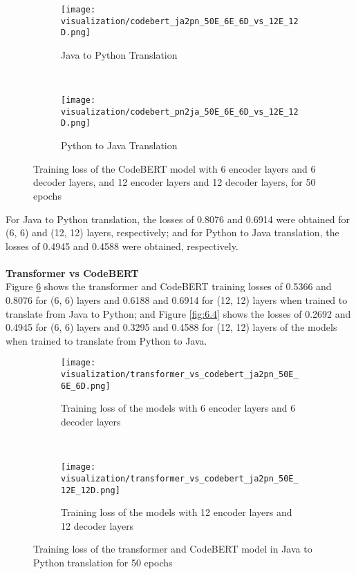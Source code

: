 \begin{figure}[H]
\centering
  \begin{subfigure}[h]{0.45\textwidth}
    \texttt{[image: visualization/codebert\_ja2pn\_50E\_6E\_6D\_vs\_12E\_12D.png]}
    \caption{Java to Python Translation}
    \label{fig:6.2_a}
  \end{subfigure}
  ~
  \begin{subfigure}[h]{0.45\textwidth}
    \texttt{[image: visualization/codebert\_pn2ja\_50E\_6E\_6D\_vs\_12E\_12D.png]}
    \caption{Python to Java Translation}
    \label{fig:6.2_b}
  \end{subfigure}
\caption[Training loss of the CodeBERT model with 6 encoder layers and 6 decoder layers, and 12 encoder layers and 12 decoder layers, for 50 epochs]{Training loss of the CodeBERT model with 6 encoder layers and 6 decoder layers, and 12 encoder layers and 12 decoder layers, for 50 epochs}
\label{fig:6.2}
\end{figure}
\noindent
For Java to Python translation, the losses of 0.8076 and 0.6914 were obtained for (6, 6) and (12, 12) layers, respectively; and for Python to Java translation, the losses of 0.4945 and 0.4588 were obtained, respectively.
\\\\
\textbf{Transformer vs CodeBERT} \\
Figure \ref{fig:6.3} shows the transformer and CodeBERT training losses of 0.5366 and 0.8076 for (6, 6) layers and 0.6188 and 0.6914 for (12, 12) layers when trained to translate from Java to Python; and Figure \ref{fig:6.4} shows the losses of 0.2692 and 0.4945 for (6, 6) layers and 0.3295 and 0.4588 for (12, 12) layers of the models when trained to translate from Python to Java.
\begin{figure}[H]
\centering
  \begin{subfigure}[h]{0.45\textwidth}
    \texttt{[image: visualization/transformer\_vs\_codebert\_ja2pn\_50E\_6E\_6D.png]}
    \caption{Training loss of the models with 6 encoder layers and 6 decoder layers}
    \label{fig:6.3_a}
  \end{subfigure}
  ~
  \begin{subfigure}[h]{0.45\textwidth}
    \texttt{[image: visualization/transformer\_vs\_codebert\_ja2pn\_50E\_12E\_12D.png]}
    \caption{Training loss of the models with 12 encoder layers and 12 decoder layers}
    \label{fig:6.3_b}
  \end{subfigure}
\caption[Training loss of the transformer and CodeBERT model in Java to Python translation for 50 epochs]{Training loss of the transformer and CodeBERT model in Java to Python translation for 50 epochs}
\label{fig:6.3}
\end{figure}

